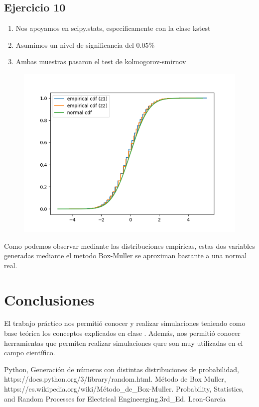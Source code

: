 \documentclass[11pt,a4paper]{article}
\begin{document}
	\subsection{Ejercicio 10}
	\begin{enumerate}
		\item Nos apoyamos en scipy.stats, especificamente con la clase kstest
		\item Asumimos un nivel de significancia del $0.05$\%
		\item Ambas muestras pasaron el test de kolmogorov-smirnov
	\end{enumerate}
	\begin{figure}[H]
  		\centering
    		\includegraphics[width=14cm]{imagenes/10}
	\end{figure}
	Como podemos observar mediante las distribuciones empiricas, estas dos variables generadas mediante el metodo Box-Muller se aproximan bastante a una normal real.

\newpage
\section{Conclusiones}
El trabajo práctico nos permitió conocer y realizar simulaciones teniendo como base teórica los conceptos explicados en clase . Además, nos permitió conocer herramientas que permiten realizar simulaciones qure son muy utilizadas en el campo científico.


\begin{thebibliography}{10}
	\bibitem{} Python, Generación de números con distintas distribuciones de probabilidad, https://docs.python.org/3/library/random.html.
	\bibitem{} Método de Box Muller, https://es.wikipedia.org/wiki/Método\_de\_Box-Muller.
	\bibitem{} Probability, Statistics, and Random Processes for Electrical Engineerging,3rd\_Ed. Leon-Garcia
\end{thebibliography}
\end{document}
